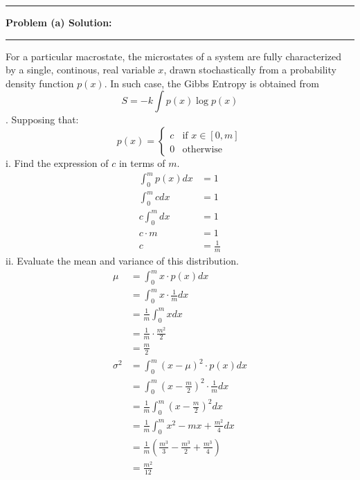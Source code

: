 \documentclass[11pt]{article}
\newcommand\question[2]{\vspace{.25in}\hrule\textbf{#1: #2}\vspace{.5em}\hrule\vspace{.10in}}
\begin{document}
\raggedright
\newcommand\NAME{Carl Kingsford}  %
\newcommand\ANDREWID{ckingsf}     %
\newcommand\HWNUM{1}              %

\newcommand{\sumn}{\sum_{n=0}^{\infty}}
\newcommand{\ea}{e^{\alpha}}
\newcommand{\nea}{e^{-\alpha}}
\newcommand{\expo}{\left(-\beta n\epsilon\right)}
\newcommand{\dif}{\mathrm{d}}

\question{Problem (a) Solution}{}
For a particular macrostate, the microstates of a system are fully characterized by
a single, continous, real variable $x$, drawn stochastically from a probability density function $p(x)$.
In such case, the Gibbs Entropy is obtained from 
\[S = -k\int p(x)\log p(x)\]. Supposing that:
\[p(x) = \begin{cases}
    c & \text{if } x \in [0,m] \\
    0 & \text{otherwise}
\end{cases}\]
i. Find the expression of $c$ in terms of $m$.
\begin{align*}
    \int_{0}^{m} p(x) dx &= 1 \\
    \int_{0}^{m} c dx &= 1 \\
    c\int_{0}^{m} dx &= 1 \\
    c\cdot m &= 1 \\
    c &= \frac{1}{m}
\end{align*}
ii. Evaluate the mean and variance of this distribution.
\begin{align*}
    \mu &= \int_{0}^{m} x\cdot p(x) dx \\
    &= \int_{0}^{m} x\cdot \frac{1}{m} dx \\
    &= \frac{1}{m}\int_{0}^{m} x dx \\
    &= \frac{1}{m}\cdot \frac{m^2}{2} \\
    &= \frac{m}{2} \\
    \sigma^2 &= \int_{0}^{m} (x-\mu)^2\cdot p(x) dx \\
    &= \int_{0}^{m} (x-\frac{m}{2})^2\cdot \frac{1}{m} dx \\
    &= \frac{1}{m}\int_{0}^{m} (x-\frac{m}{2})^2 dx \\
    &= \frac{1}{m}\int_{0}^{m} x^2 - mx + \frac{m^2}{4} dx \\
    &= \frac{1}{m}(\frac{m^3}{3} - \frac{m^3}{2} + \frac{m^3}{4}) \\
    &= \frac{m^2}{12}
\end{align*}
\end{document}
